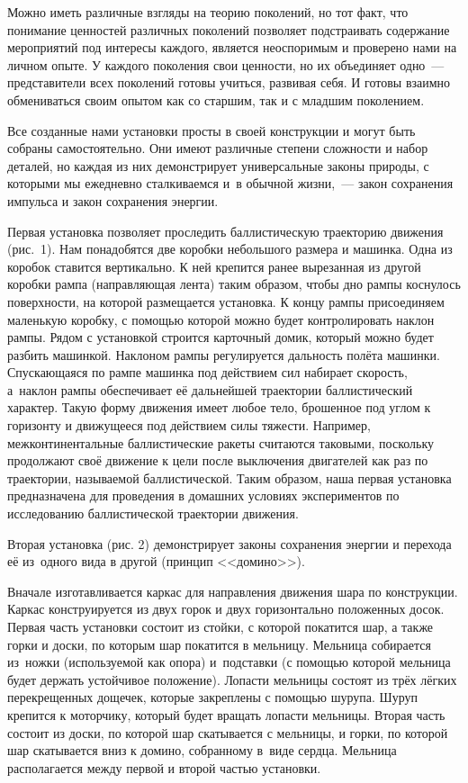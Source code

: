 Можно иметь различные взгляды на теорию поколений, но тот факт, что понимание ценностей различных поколений позволяет подстраивать содержание мероприятий под интересы каждого, является неоспоримым и проверено нами на личном опыте. У каждого поколения свои ценности, но их объединяет одно~--- представители всех поколений готовы учиться, развивая себя. И готовы взаимно обмениваться своим опытом как со старшим, так и с младшим поколением.

Все созданные нами установки просты в своей конструкции и могут быть собраны самостоятельно. Они имеют различные степени сложности и набор деталей, но каждая из них демонстрирует универсальные законы природы, с которыми мы ежедневно сталкиваемся и~в обычной жизни,~--- закон сохранения импульса и закон сохранения энергии.

Первая установка позволяет проследить баллистическую траекторию движения (рис.~1). Нам понадобятся две коробки небольшого размера и машинка. Одна из коробок ставится вертикально. К ней крепится ранее вырезанная из другой коробки рампа (направляющая лента) таким образом, чтобы дно рампы коснулось поверхности, на которой размещается установка.  К концу рампы присоединяем маленькую коробку, с помощью которой можно будет контролировать наклон рампы. Рядом с установкой строится карточный домик, который можно будет разбить машинкой. Наклоном рампы регулируется дальность полёта машинки. Спускающаяся по рампе машинка под действием сил набирает скорость, а~наклон рампы обеспечивает её дальнейшей траектории баллистический характер. Такую форму движения имеет любое тело, брошенное под углом к горизонту и движущееся под действием силы тяжести. Например, межконтинентальные баллистические ракеты считаются таковыми, поскольку продолжают своё движение к цели после выключения двигателей как раз по траектории, называемой баллистической. Таким образом, наша первая установка предназначена для проведения в домашних условиях экспериментов по исследованию баллистической траектории движения.



Вторая установка (рис. 2) демонстрирует законы сохранения энергии и перехода её из~одного вида в другой (принцип <<домино>>).

Вначале изготавливается каркас для направления движения шара по конструкции. Каркас конструируется из двух горок и двух горизонтально положенных досок. Первая часть установки состоит из стойки, с которой покатится шар, а также горки и доски, по которым шар покатится в мельницу. Мельница собирается из~ножки (используемой как опора) и~подставки (с помощью которой мельница будет держать устойчивое положение). Лопасти мельницы состоят из трёх лёгких перекрещенных дощечек, которые закреплены с помощью шурупа. Шуруп крепится к моторчику, который будет вращать лопасти мельницы. Вторая часть состоит из доски, по которой шар скатывается с мельницы, и горки, по которой шар скатывается вниз к домино, собранному в~виде сердца. Мельница располагается между первой и второй частью установки.\enlargethispage{\baselineskip}

